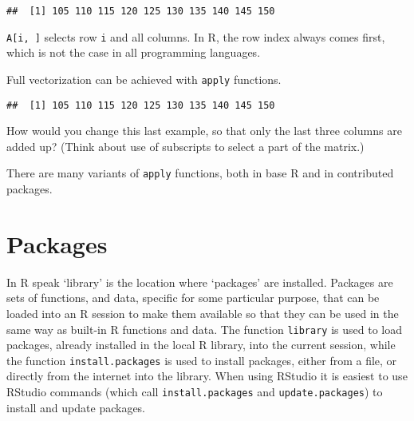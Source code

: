 \documentclass[paper=a4,headsepline,BCOR=12mm,twoside,open=right,%
titlepage,headings=small,fontsize=10pt,index=totoc,bibliography=totoc,%
captions=tableheading,captions=nooneline]{scrbook}\usepackage{knitr}
\begin{document}
\begin{knitrout}\footnotesize
{}\color{fgcolor}\begin{kframe}
\begin{alltt}
 \hlkwb{<-} \hlstd{(} 
   \hlopt{:}
   \hlkwb{<-} 
\hlstd{\}}
\end{alltt}
\begin{verbatim}
##  [1] 105 110 115 120 125 130 135 140 145 150
\end{verbatim}
\end{kframe}
\end{knitrout}

\texttt{A[i, ]} selects row \texttt{i} and all columns. In R, the row index always comes first, which is not the case in all programming languages.

Full vectorization can be achieved with \texttt{apply} functions.

\begin{knitrout}\footnotesize
{}\color{fgcolor}\begin{kframe}
\begin{alltt}
 \hlkwb{<-}   \hlstd{=}  
\end{alltt}
\begin{verbatim}
##  [1] 105 110 115 120 125 130 135 140 145 150
\end{verbatim}
\end{kframe}
\end{knitrout}

How would you change this last example, so that only the last three columns are added up? (Think about use of subscripts to select a part of the matrix.)

There are many variants of \texttt{apply} functions, both in base R and in contributed packages.

\section{Packages}

In R speak `library' is the location where `packages' are installed. Packages are sets of functions, and data, specific for some particular purpose, that can be loaded into an R session to make them available so that they can be used in the same way as built-in R functions and data. The function \texttt{library} is used to load packages, already installed in the local R library, into the current session, while the function \texttt{install.packages} is used to install packages, either from a file, or directly from the internet into the library. When using RStudio it is easiest to use RStudio commands (which call \texttt{install.packages} and \texttt{update.packages}) to install and update packages.
\end{document}
